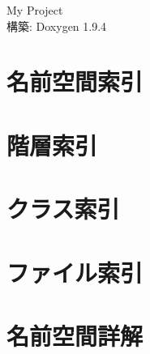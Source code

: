 \documentclass[twoside]{book}
\newcommand{\+}{\discretionary{\mbox{\scriptsize$\hookleftarrow$}}{}{}}
\newcommand{\clearemptydoublepage}{%
    \newpage{\pagestyle{empty}\cleardoublepage}%
  }
\begin{document}
  \raggedbottom
  \begin{CJK}{UTF8}{min}
    \hypersetup{pageanchor=false,
                bookmarksnumbered=true,
                pdfencoding=unicode
               }
  \begin{titlepage}
  \vspace*{7cm}
  \begin{center}%
  {\Large My Project}\\
  \vspace*{1cm}
  {\large 構築\+: Doxygen 1.9.4}\\
  \end{center}
  \end{titlepage}
  \clearemptydoublepage
  \tableofcontents
  \clearemptydoublepage
  \hypersetup{pageanchor=true}
\chapter{名前空間索引}

\chapter{階層索引}

\chapter{クラス索引}

\chapter{ファイル索引}

\chapter{名前空間詳解}







\end{CJK}
\end{document}
